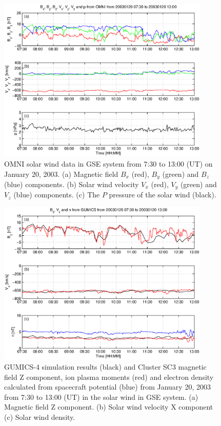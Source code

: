 \documentclass[linenumbers,draft]{agujournal}
\begin{document}
\begin{figure}[h]
\centering
\includegraphics[width=0.9\textwidth,angle=0]{swe-2020-corr-f02.eps}  
\caption{OMNI solar wind data in GSE system from 7:30 to 13:00 (UT) on January 20, 2003. (a) Magnetic field $B_{x}$ (red), $B_{y}$ (green) and $B_{z}$ (blue) components. (b) Solar wind velocity $V_{x}$ (red), $V_{y}$ (green) and $V_{z}$ (blue) components. (c) The $P$ pressure of the solar wind (black).}

\label{fig:swomni}
\end{figure}

\pagebreak

\begin{figure}[h]
\centering
\includegraphics[width=0.9\textwidth,angle=0]{swe-2020-corr-f03.eps}  
\caption{GUMICS-4 simulation results (black) and Cluster SC3 magnetic field Z component, ion plasma moments (red) and electron density calculated from spacecraft potential (blue) from January 20, 2003 from 7:30 to 13:00 (UT) in the solar wind in GSE system. (a) Magnetic field Z component. (b) Solar wind velocity X component (c) Solar wind density.}
\label{fig:swplot}
\end{figure}
\end{document}
